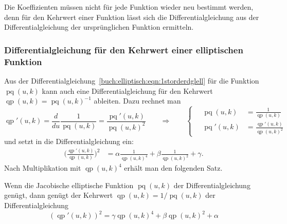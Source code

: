 Die Koeffizienten müssen nicht für jede Funktion wieder neu bestimmt
werden, denn für den Kehrwert einer Funktion lässt sich die
Differentialgleichung aus der Differentialgleichung der ursprünglichen
Funktion ermitteln.

%
%
\subsubsection{Differentialgleichung für den Kehrwert einer elliptischen Funktion}
Aus der Differentialgleichung~\eqref{buch:elliptisch:eqn:1storderdglell}
für die Funktion $\operatorname{pq}(u,k)$ kann auch eine
Differentialgleichung für den Kehrwert
$\operatorname{qp}(u,k)=\operatorname{pq}(u,k)^{-1}$
ableiten.
Dazu rechnet man
\[
\operatorname{qp}'(u,k)
=
\frac{d}{du}\frac{1}{\operatorname{pq}(u,k)}
=
\frac{\operatorname{pq}'(u,k)}{\operatorname{pq}(u,k)^2}
\qquad\Rightarrow\qquad
\left\{
\quad
\begin{aligned}
\operatorname{pq}(u,k)
&=
\frac{1}{\operatorname{qp}(u,k)}
\\
\operatorname{pq}'(u,k)
&=
\frac{\operatorname{qp}'(u,k)}{\operatorname{qp}(u,k)^2}
\end{aligned}
\right.
\]
und setzt in die Differentialgleichung ein:
\begin{align*}
\biggl(
\frac{
\operatorname{qp}'(u,k)
}{
\operatorname{qp}(u,k)
}
\biggr)^2
&=
\alpha \frac{1}{\operatorname{qp}(u,k)^4}
+
\beta \frac{1}{\operatorname{qp}(u,k)^2}
+
\gamma.
\end{align*}
Nach Multiplikation mit $\operatorname{qp}(u,k)^4$ erhält man den
folgenden Satz.

\begin{satz}
Wenn die Jacobische elliptische Funktion $\operatorname{pq}(u,k)$
der Differentialgleichung genügt, dann genügt der Kehrwert
$\operatorname{qp}(u,k) = 1/\operatorname{pq}(u,k)$ der Differentialgleichung
\begin{equation}
(\operatorname{qp}'(u,k))^2
= 
\gamma \operatorname{qp}(u,k)^4
+
\beta \operatorname{qp}(u,k)^2
+
\alpha
\label{buch:elliptisch:eqn:kehrwertdgl}
\end{equation}
\end{satz}

